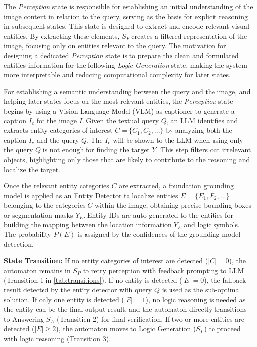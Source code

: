 The \emph{Perception} state is responsible for establishing an initial understanding of the image content in relation to the query, serving as the basis for explicit reasoning in subsequent states. This state is designed to extract and encode relevant visual entities. By extracting these elements, $S_P$ creates a filtered representation of the image, focusing only on entities relevant to the query. The motivation for designing a dedicated \emph{Perception} state is to prepare the clean and formulated entities information for the following \emph{Logic Generation} state, making the system more interpretable and reducing computational complexity for later states.

For establishing a semantic understanding between the query and the image, and helping later states focus on the most relevant entities, the \emph{Perception} state begins by using a Vision-Language Model (VLM) as captioner to generate a caption $I_c$ for the image $I$. Given the textual query $Q$, an LLM identifies and extracts entity categories of interest $C = \{C_1, C_2, ...\}$ by analyzing both the caption $I_c$ and the query $Q$. The $I_c$ will be shown to the LLM when using only the query $Q$ is not enough for finding the target $Y$. This step filters out irrelevant objects, highlighting only those that are likely to contribute to the reasoning and localize the target.

Once the relevant entity categories $C$ are extracted, a foundation grounding model is applied as an Entity Detector to localize entities $E=\{E_1, E_2, ...\}$ belonging to the categories $C$ within the image, obtaining precise bounding boxes or segmentation masks $Y_E$. Entity IDs are auto-generated to the entities for building the mapping between the location information $Y_E$ and logic symbols. The probability $P(E)$ is assigned by the confidences of the grounding model detection.

\textbf{State Transition:} If no entity categories of interest are detected ($|C| = 0$), the automaton remains in $S_P$ to retry perception with feedback prompting to LLM (Transition 1 in \autoref{tab:transitions}). If no entity is detected ($|E| = 0$), the fallback result detected by the entity detector with query $Q$ is used as the sub-optimal solution. If only one entity is detected ($|E| = 1$), no logic reasoning is needed as the entity can be the final output result, and the automaton directly transitions to Answering $S_A$ (Transition 2) for final verification. If two or more entities are detected ($|E| \geq 2$), the automaton moves to Logic Generation ($S_L$) to proceed with logic reasoning (Transition 3).

